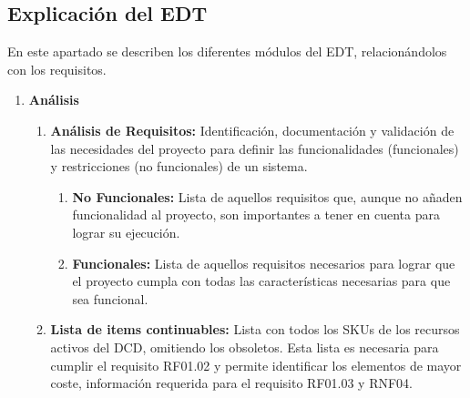 \subsection{Explicación del EDT}
En este apartado se describen los diferentes módulos del EDT, relacionándolos con los requisitos.
\begin{enumerate}
    \renewcommand{\theenumii}{\theenumi.\arabic{enumii}}
    \renewcommand{\theenumiii}{\theenumii.\arabic{enumiii}}
    \renewcommand{\labelenumii}{\theenumii}
    \renewcommand{\labelenumiii}{\theenumiii}

    \item \textbf{Análisis}
          \begin{enumerate}
              \item \textbf{Análisis de Requisitos:} Identificación, documentación y validación de las necesidades del proyecto para definir las funcionalidades (funcionales) y restricciones (no funcionales) de un sistema.
                    \setcounter{enumiii}{0} %
                    \begin{enumerate}
                        \item \textbf{No Funcionales:} Lista de aquellos requisitos que, aunque no añaden funcionalidad al proyecto, son importantes a tener en cuenta para lograr su ejecución.
                        \item \textbf{Funcionales:} Lista de aquellos requisitos necesarios para lograr que el proyecto cumpla con todas las características necesarias para que sea funcional.
                    \end{enumerate}
              \item \textbf{Lista de items continuables:} Lista con todos los SKUs de los recursos activos del DCD, omitiendo los obsoletos. Esta lista es necesaria para cumplir el requisito RF01.02 y permite identificar los elementos de mayor coste, información requerida para el requisito RF01.03 y RNF04.
          \end{enumerate}


\end{enumerate}
